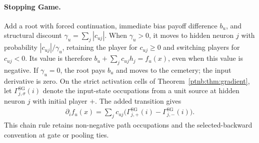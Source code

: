 \paragraph{Stopping Game.}
Add a root with forced continuation, immediate bias payoff difference $b_u$, and structural
discount $\gamma_u=\sum_j|c_{uj}|$. When $\gamma_u>0$, it moves to hidden neuron $j$ with
probability $|c_{uj}|/\gamma_u$, retaining the player for $c_{uj}\geq0$ and switching players
for $c_{uj}<0$. Its value is therefore $b_u+\sum_jc_{uj}h_j=f_u(x)$, even when this value is
negative. If $\gamma_u=0$, the root pays $b_u$ and moves to the cemetery; the input derivative
is zero. On the strict activation cells of Theorem~\ref{ptnb:thm:gradient}, let
$\Gamma^{\mathrm{SG}}_{j,\sigma}(i)$ denote the input-state occupations from a unit source at
hidden neuron $j$ with initial player $+$. The added transition gives
\begin{align}\label{ptnb:eq:affine-readout-gradient}
    \partial_i f_u(x)=\sum_j c_{uj}
    \bigl(\Gamma^{\mathrm{SG}}_{j,+}(i)-\Gamma^{\mathrm{SG}}_{j,-}(i)\bigr).
\end{align}
This chain rule retains non-negative path occupations and the selected-backward convention at gate
or pooling ties.


